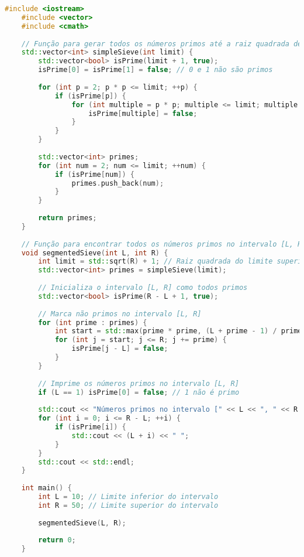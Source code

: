 \documentclass{article}
\begin{document}
\begin{lstlisting}[language=C++, caption=Segmented Sieve]
    #include <iostream>
    #include <vector>
    #include <cmath>
    
    // Função para gerar todos os números primos até a raiz quadrada de um limite usando o Sieve of Eratosthenes
    std::vector<int> simpleSieve(int limit) {
        std::vector<bool> isPrime(limit + 1, true);
        isPrime[0] = isPrime[1] = false; // 0 e 1 não são primos
        
        for (int p = 2; p * p <= limit; ++p) {
            if (isPrime[p]) {
                for (int multiple = p * p; multiple <= limit; multiple += p) {
                    isPrime[multiple] = false;
                }
            }
        }
    
        std::vector<int> primes;
        for (int num = 2; num <= limit; ++num) {
            if (isPrime[num]) {
                primes.push_back(num);
            }
        }
    
        return primes;
    }
    
    // Função para encontrar todos os números primos no intervalo [L, R] usando o Segmented Sieve
    void segmentedSieve(int L, int R) {
        int limit = std::sqrt(R) + 1; // Raiz quadrada do limite superior
        std::vector<int> primes = simpleSieve(limit);
    
        // Inicializa o intervalo [L, R] como todos primos
        std::vector<bool> isPrime(R - L + 1, true);
    
        // Marca não primos no intervalo [L, R]
        for (int prime : primes) {
            int start = std::max(prime * prime, (L + prime - 1) / prime * prime); // Maior múltiplo de 'prime' >= L
            for (int j = start; j <= R; j += prime) {
                isPrime[j - L] = false;
            }
        }
    
        // Imprime os números primos no intervalo [L, R]
        if (L == 1) isPrime[0] = false; // 1 não é primo
    
        std::cout << "Números primos no intervalo [" << L << ", " << R << "]: ";
        for (int i = 0; i <= R - L; ++i) {
            if (isPrime[i]) {
                std::cout << (L + i) << " ";
            }
        }
        std::cout << std::endl;
    }
    
    int main() {
        int L = 10; // Limite inferior do intervalo
        int R = 50; // Limite superior do intervalo
    
        segmentedSieve(L, R);
    
        return 0;
    }
\end{lstlisting}
\end{document}
